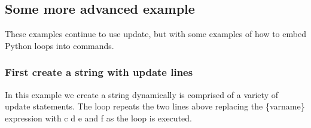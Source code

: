 \documentclass[letterpaper,10pt,english]{jupyterBook}
\begin{document}
\subsection{Some more advanced example}
\label{\detokenize{content/04_PythonEssentials/UpdateCommand:some-more-advanced-example}}
\sphinxAtStartPar
These examples continue to use update, but with some examples of how to embed Python loops into commands.


\subsubsection{First create a string with update lines}
\label{\detokenize{content/04_PythonEssentials/UpdateCommand:first-create-a-string-with-update-lines}}
\sphinxAtStartPar
In this example we create a string dynamically is comprised of a variety of update statements.  The loop repeats the two lines above replacing the \{varname\} expression with c d e and f as the loop is executed.
\end{document}
